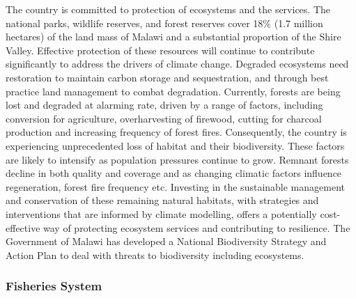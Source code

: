\documentclass[
]{book}
\begin{document}
The country is committed to protection of ecosystems and the services. The national parks, wildlife reserves, and forest reserves cover 18\% (1.7 million hectares) of the land mass of Malawi and a substantial proportion of the Shire Valley. Effective protection of these resources will continue to contribute significantly to address the drivers of climate change. Degraded ecosystems need restoration to maintain carbon storage and sequestration, and through best practice land management to combat degradation. Currently, forests are being lost and degraded at alarming rate, driven by a range of factors, including conversion for agriculture, overharvesting of firewood, cutting for charcoal production and increasing frequency of forest fires. Consequently, the country is experiencing unprecedented loss of habitat and their biodiversity. These factors are likely to intensify as population pressures continue to grow. Remnant forests decline in both quality and coverage and as changing climatic factors influence regeneration, forest fire frequency etc. Investing in the sustainable management and conservation of these remaining natural habitats, with strategies and interventions that are informed by climate modelling, offers a potentially cost-effective way of protecting ecosystem services and contributing to resilience. The Government of Malawi has developed a National Biodiversity Strategy and Action Plan to deal with threats to biodiversity including ecosystems.

\hypertarget{fisheries-system}{%
\subsubsection{Fisheries System}\label{fisheries-system}}
\end{document}

